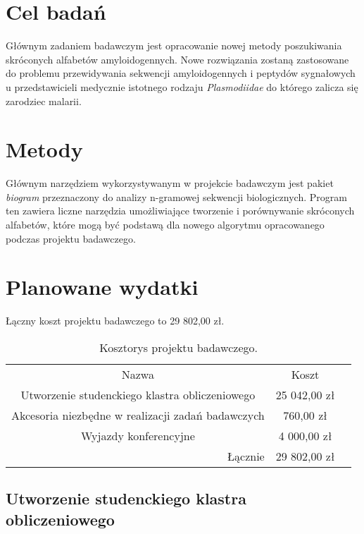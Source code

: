 \documentclass{article}
\begin{document}
\section{Cel badań}

Głównym zadaniem badawczym jest opracowanie nowej metody poszukiwania 
skróconych alfabetów amyloidogennych. Nowe rozwiązania zostaną zastosowane do 
problemu przewidywania sekwencji amyloidogennych i peptydów sygnałowych u 
przedstawicieli medycznie istotnego rodzaju \textit{Plasmodiidae} do którego 
zalicza się zarodziec malarii.

\section{Metody}

Głównym narzędziem wykorzystywanym w projekcie badawczym jest pakiet 
\textit{biogram} przeznaczony do analizy n-gramowej sekwencji biologicznych. 
Program ten zawiera liczne narzędzia umożliwiające tworzenie i porównywanie 
skróconych alfabetów, które mogą być podstawą dla nowego algorytmu opracowanego 
podczas projektu badawczego.


\section{Planowane wydatki}

Łączny koszt projektu badawczego to 29 802,00 zł.

\begin{table}[!htbp]
\centering
\caption*{Kosztorys projektu badawczego.}
\begin{tabular}{rrr}
\cline{1-2}
\multicolumn{1}{|c}{Nazwa}                                   & \multicolumn{1}{|c|}{Koszt}   &  \\ \cline{1-2}
\multicolumn{1}{|c}{Utworzenie studenckiego klastra obliczeniowego} & 
\multicolumn{1}{|c|}{25 042,00 zł} &  \\ \cline{1-2}
\multicolumn{1}{|c}{Akcesoria niezbędne w realizacji zadań badawczych}   & 
\multicolumn{1}{|c|}{760,00 zł} &  \\ \cline{1-2}
\multicolumn{1}{|c}{Wyjazdy konferencyjne}   & 
\multicolumn{1}{|c|}{4 000,00 zł} &  \\ \cline{1-2}
Łącznie    & 29 802,00 zł                    & 
\end{tabular}
\end{table}

\subsection{Utworzenie studenckiego klastra obliczeniowego}
\end{document}
